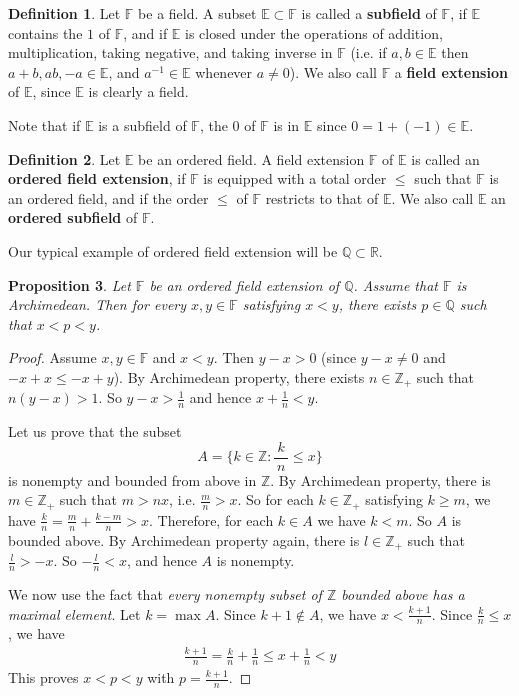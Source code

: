 \documentclass[12pt,b5paper,notitlepage]{article}
\theoremstyle{definition}
\newtheorem{df}{Definition}[section]
\theoremstyle{plain}
\newtheorem{pp}[df]{Proposition}
\newcommand{\Zbb}{\mathbb Z}
\newcommand{\Qbb}{\mathbb Q}
\newcommand{\Rbb}{\mathbb R}
\newcommand{\Ebb}{\mathbb E}
\newcommand{\Fbb}{\mathbb F}
\numberwithin{equation}{section}
\begin{document}
\begin{df}
Let $\Fbb$ be a field. A subset $\Ebb\subset\Fbb$ is called a  \textbf{subfield}  of $\Fbb$, if $\Ebb$ contains the $1$ of $\Fbb$, and if $\Ebb$ is closed under the operations of addition, multiplication, taking negative, and taking inverse in $\Fbb$ (i.e. if $a,b\in\Ebb$ then $a+b,ab,-a\in\Ebb$, and $a^{-1}\in\Ebb$ whenever $a\neq 0$). We also call $\Fbb$ a  \textbf{field extension} of $\Ebb$, since $\Ebb$ is clearly a field.
\end{df}

Note that if $\Ebb$ is a subfield of $\Fbb$, the $0$ of $\Fbb$ is in $\Ebb$ since $0=1+(-1)\in\Ebb$.

\begin{df}
Let $\Ebb$ be an ordered field. A field extension $\Fbb$ of $\Ebb$ is called an  \textbf{ordered field extension}, if $\Fbb$ is equipped with a total order $\leq$ such that $\Fbb$ is an ordered field, and if the order $\leq$ of $\Fbb$ restricts to that of $\Ebb$. We also call $\Ebb$ an \textbf{ordered subfield} of $\Fbb$.
\end{df}

Our typical example of ordered field extension will be $\Qbb\subset\Rbb$.

\begin{pp}\label{lb2}
Let $\Fbb$ be an ordered field extension  of $\Qbb$. Assume that $\Fbb$ is Archimedean. Then for every $x,y\in\Fbb$ satisfying $x<y$, there exists $p\in\Qbb$ such that $x<p<y$.
\end{pp}

\begin{proof}
Assume $x,y\in\Fbb$ and $x<y$. Then $y-x>0$ (since $y-x\neq 0$ and $-x+x\leq -x+y$). By Archimedean property, there exists $n\in\Zbb_+$ such that $n(y-x)>1$. So $\displaystyle y-x>\frac 1n$ and hence $\displaystyle x+\frac 1n<y$.

Let us prove that the subset
\begin{equation*}
A=\big\{k\in\Zbb: \frac {~k~}{n}\leq x\big\}
\end{equation*}
is nonempty and bounded from above in $\Zbb$. By Archimedean property, there is $m\in\Zbb_+$ such that $m>nx$, i.e. $\displaystyle \frac mn>x$. So for each $k\in\Zbb_+$ satisfying $k\geq m$, we have $\displaystyle \frac kn=\frac mn+\frac{k-m}n>x$. Therefore, for each $k\in A$ we have $k<m$. So $A$ is bounded above. By Archimedean property again, there is $l\in\Zbb_+$ such that $\displaystyle \frac ln>-x$. So $\displaystyle -\frac ln<x$, and hence $A$ is nonempty.

We now use the fact that \emph{every nonempty subset of $\Zbb$ bounded above has a maximal element}. Let $k=\max A$. Since $k+1\notin A$, we have $\displaystyle x<\frac{k+1}n$. Since $\displaystyle \frac kn\leq x$, we have
\begin{align*}
\frac{k+1}n=\frac kn+\frac 1n\leq x+\frac 1n<y
\end{align*}
This proves $x<p<y$ with $\displaystyle p=\frac{k+1}n$.
\end{proof}
\end{document}
